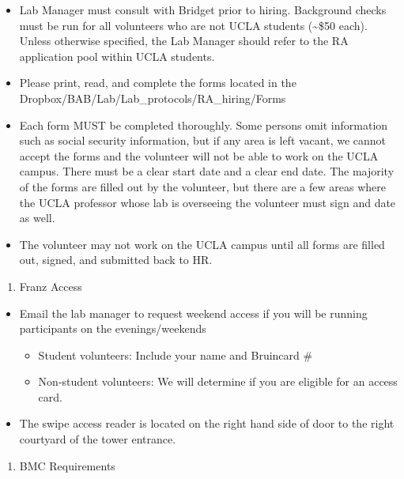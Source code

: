 \documentclass[]{book}
\providecommand{\tightlist}{%
  \setlength{\itemsep}{0pt}\setlength{\parskip}{0pt}}
\begin{document}
\begin{itemize}
\tightlist
\item
  Lab Manager must consult with Bridget prior to hiring. Background
  checks must be run for all volunteers who are not UCLA students
  (\textasciitilde{}\$50 each). Unless otherwise specified, the Lab
  Manager should refer to the RA application pool within UCLA students.
\item
  Please print, read, and complete the forms located in the
  Dropbox/BAB/Lab/Lab\_protocols/RA\_hiring/Forms
\item
  Each form MUST be completed thoroughly. Some persons omit information
  such as social security information, but if any area is left vacant,
  we cannot accept the forms and the volunteer will not be able to work
  on the UCLA campus. There must be a clear start date and a clear end
  date. The majority of the forms are filled out by the volunteer, but
  there are a few areas where the UCLA professor whose lab is overseeing
  the volunteer must sign and date as well.
\item
  The volunteer may not work on the UCLA campus until all forms are
  filled out, signed, and submitted back to HR.
\end{itemize}

\begin{enumerate}
\def\labelenumi{\arabic{enumi}.}
\setcounter{enumi}{4}
\tightlist
\item
  Franz Access
\end{enumerate}

\begin{itemize}
\tightlist
\item
  Email the lab manager to request weekend access if you will be running
  participants on the evenings/weekends

  \begin{itemize}
  \tightlist
  \item
    Student volunteers: Include your name and Bruincard \#
  \item
    Non-student volunteers: We will determine if you are eligible for an
    access card.
  \end{itemize}
\item
  The swipe access reader is located on the right hand side of door to
  the right courtyard of the tower entrance.
\end{itemize}

\begin{enumerate}
\def\labelenumi{\arabic{enumi}.}
\setcounter{enumi}{5}
\tightlist
\item
  BMC Requirements
\end{enumerate}
\end{document}
